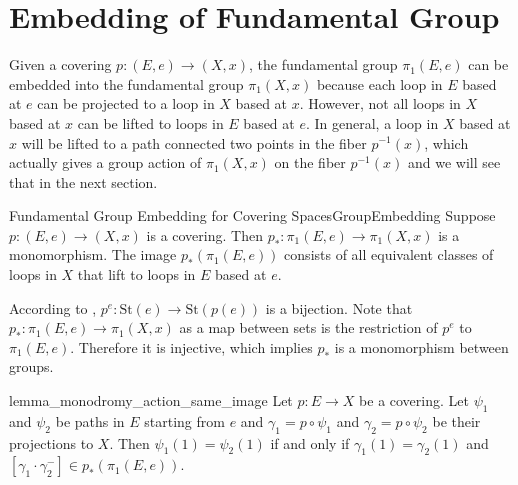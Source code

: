 \documentclass{report}
\begin{document}
\section{Embedding of Fundamental Group}
Given a covering $p:(E,e)\to (X,x)$, the fundamental group $\pi_1(E,e)$ can be embedded into the fundamental group $\pi_1(X,x)$ because each loop in $E$ based at $e$ can be projected to a loop in $X$ based at $x$. However, not all loops in $X$ based at $x$ can be lifted to loops in $E$ based at $e$. In general, a loop in $X$ based at $x$ will be lifted to a path connected two points in the fiber $p^{-1}(x)$, which actually gives a group action of $\pi_1(X,x)$ on the fiber $p^{-1}(x)$ and we will see that in the next section.




\begin{corollary}{Fundamental Group Embedding for Covering Spaces}{GroupEmbedding}
	Suppose $p: (E,e) \to (X,x)$ is a covering. Then $p_*: \pi_1(E, e) \to \pi_1(X, x)$ is a monomorphism. The image $p_*(\pi_1(E, e))$ consists of all equivalent classes of loops in $X$ that lift to loops in $E$ based at $e$.
\end{corollary}

\begin{prf}
	According to , $p^e:\mathrm{St}(e)\to\mathrm{St}(p(e))$ is a bijection. Note that $p_*: \pi_1(E, e) \to \pi_1(X, x)$ as a map between sets is the restriction of $p^e$ to $\pi_1(E, e)$. Therefore it is injective, which implies $p_*$ is a monomorphism between groups.
\end{prf}



\begin{lemma}{}{lemma_monodromy_action_same_image}
	Let $p:E\to X$ be a covering. Let $\psi_1$ and $\psi_2$ be paths in $E$ starting from $e$ and $\gamma_1=p\circ \psi_1$ and $\gamma_2=p\circ \psi_2$ be their projections to $X$. Then $\psi_1(1)=\psi_2(1)$ if and only if $\gamma_1(1)=\gamma_2(1)$ and $\left[\gamma_1 \cdot \gamma_2^{-}\right]\in p_* \left(\pi_1(E, e)\right)$.
\end{lemma}
\end{document}
